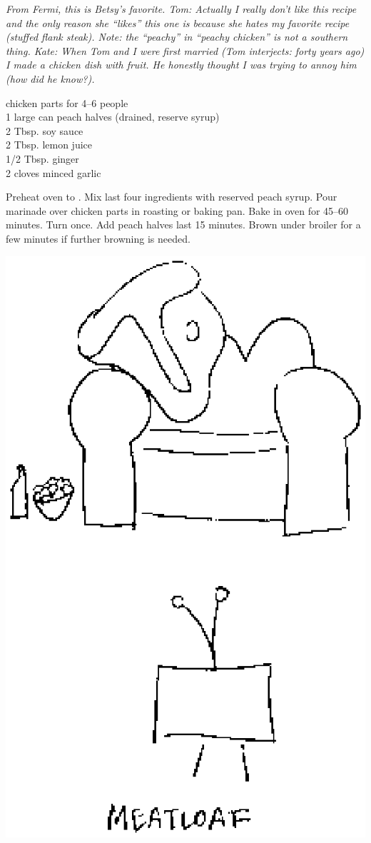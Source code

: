 \textit{From Fermi, this is Betsy's favorite.  Tom:  Actually I
really don't like this recipe and the only reason she ``likes'' this one is
because she hates my favorite recipe (stuffed flank steak).  Note:  the
``peachy'' in ``peachy chicken'' is not a southern thing.  Kate:  When Tom and
I were first married (Tom interjects: forty years ago) I made a chicken dish
with fruit.  He honestly thought I was trying to annoy him (how did he know?).}
\begin{ingredients}
chicken parts for 4--6 people\\
1 large can peach halves (drained, reserve syrup)\\
2 Tbsp. soy sauce\\
2 Tbsp. lemon juice\\
1/2 Tbsp. ginger\\
2 cloves minced garlic
\end{ingredients}
Preheat oven to .  Mix last four ingredients with reserved peach
syrup.  Pour marinade over chicken parts in roasting or baking pan. Bake in
oven for 45--60 minutes. Turn once.  Add peach halves last 15 minutes.  Brown
under broiler for a few minutes if further browning is needed.

\centerline{\includegraphics[scale=.5,clip]{meatloaf.ps}}

